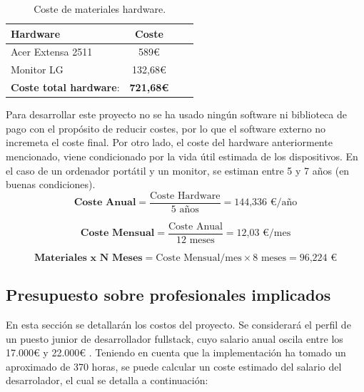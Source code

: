 \begin{table}[H]
    \begin{center}
    \begin{tabular}{| l | c | c | c |}
        \hline
        \textbf{Hardware} & \textbf{Coste} \\ \hline
        Acer Extensa 2511 & 589\euro \\
        Monitor LG & 132,68\euro \\ \hline
        \textbf{Coste total hardware}: & \textbf{721,68\euro} \\ \hline
    \end{tabular}
    \caption{Coste de materiales hardware.}
    \label{tab:costes-hardware}
    \end{center}
\end{table} 

Para desarrollar este proyecto no se ha usado ningún software ni biblioteca de pago con el propósito de reducir costes, por lo que el software externo no incremeta el coste final. Por otro lado, el coste del hardware anteriormente mencionado, viene condicionado por la vida útil estimada de los dispositivos. En el caso de un ordenador portátil y un monitor, se estiman entre 5 y 7 años (en buenas condiciones)\cite{tecfys2023}.
\begin{equation}
    \textbf{Coste Anual} = \frac {\text{Coste Hardware}}{\text{5 años}} = \text{144,336 €/año}
\end{equation}

\begin{equation}
    \textbf{Coste Mensual} = \frac {\text{Coste Anual}}{\text{12 meses}} = \text{12,03 €/mes}
\end{equation}

\begin{equation}
    \textbf{Materiales x N Meses} = \text{Coste Mensual/mes} \times \text{8 meses} = \text{96,224 €}
\end{equation}

\subsection{Presupuesto sobre profesionales implicados}
En esta sección se detallarán los costos del proyecto. Se considerará el perfil de un puesto junior de desarrollador fullstack, cuyo salario anual oscila entre los 17.000€ y 22.000€ \cite{glassdoor2024}.
Teniendo en cuenta que la implementación ha tomado un aproximado de 370 horas, se puede calcular un coste estimado del salario del desarrolador, el cual se detalla a continuación:

